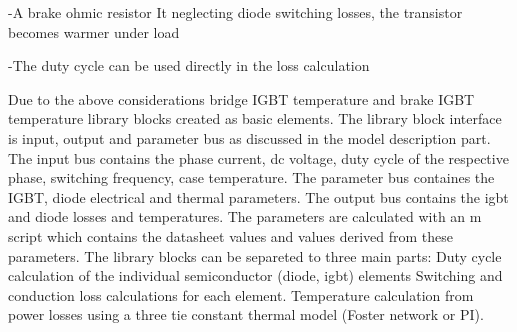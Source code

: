 -A brake ohmic resistor
It neglecting diode switching losses, the transistor becomes warmer under load

-The duty cycle can be used directly in the loss calculation

Due to the above considerations bridge IGBT temperature and brake IGBT temperature library blocks created as basic elements. The library block interface is input, output and parameter bus as discussed in the model description part. The input bus contains the phase current, dc voltage, duty cycle of the respective phase, switching frequency, case temperature. The parameter bus containes the IGBT, diode electrical and thermal parameters. The output bus contains the igbt and diode losses and temperatures. The parameters are calculated with an m script which contains the datasheet values and values derived from these parameters.
The library blocks can be separeted to three main parts:
Duty cycle calculation of the individual semiconductor (diode, igbt) elements
Switching and conduction loss calculations for each element.
Temperature calculation from power losses using a three tie constant thermal model (Foster network or PI). 

